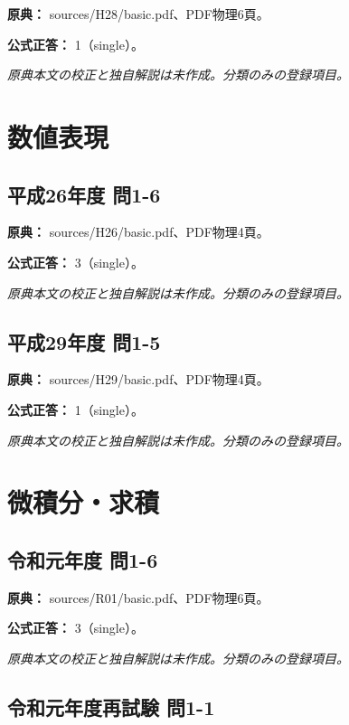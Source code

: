\noindent\textbf{原典：} sources/H28/basic.pdf、PDF物理6頁。

\textbf{公式正答：} 1（single）。

\par\textit{原典本文の校正と独自解説は未作成。分類のみの登録項目。}

\section{数値表現}

\subsection{平成26年度 問1-6}
\label{q:h26-reg-basic-1-6}

\noindent\textbf{原典：} sources/H26/basic.pdf、PDF物理4頁。

\textbf{公式正答：} 3（single）。

\par\textit{原典本文の校正と独自解説は未作成。分類のみの登録項目。}

\subsection{平成29年度 問1-5}
\label{q:h29-reg-basic-1-5}

\noindent\textbf{原典：} sources/H29/basic.pdf、PDF物理4頁。

\textbf{公式正答：} 1（single）。

\par\textit{原典本文の校正と独自解説は未作成。分類のみの登録項目。}

\section{微積分・求積}

\subsection{令和元年度 問1-6}
\label{q:r01-reg-basic-1-6}

\noindent\textbf{原典：} sources/R01/basic.pdf、PDF物理6頁。

\textbf{公式正答：} 3（single）。

\par\textit{原典本文の校正と独自解説は未作成。分類のみの登録項目。}

\subsection{令和元年度再試験 問1-1}
\label{q:r01-ret-basic-1-1}


